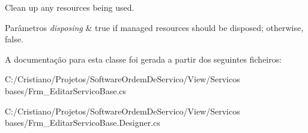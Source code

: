 Clean up any resources being used. 


\begin{DoxyParams}{Parâmetros}
{\em disposing} & true if managed resources should be disposed; otherwise, false.\\
\hline
\end{DoxyParams}


A documentação para esta classe foi gerada a partir dos seguintes ficheiros\+:\begin{DoxyCompactItemize}
\item 
C\+:/\+Cristiano/\+Projetos/\+Software\+Ordem\+De\+Servico/\+View/\+Servicos bases/Frm\+\_\+\+Editar\+Servico\+Base.\+cs\item 
C\+:/\+Cristiano/\+Projetos/\+Software\+Ordem\+De\+Servico/\+View/\+Servicos bases/Frm\+\_\+\+Editar\+Servico\+Base.\+Designer.\+cs\end{DoxyCompactItemize}
